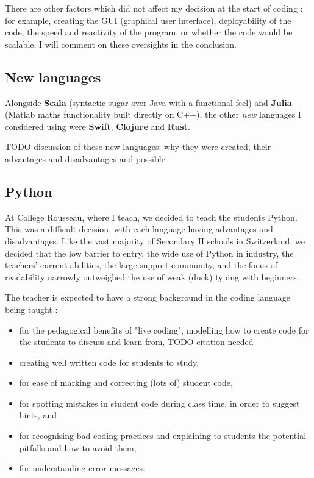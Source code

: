 \documentclass[10pt]{article}
\begin{document}
There are other factors which did not affect my decision at the start of coding : for example, creating the GUI (graphical user interface), deployability of the code, the speed and reactivity of the program, or whether the code would be scalable. I will comment on these oversights in the conclusion.



\subsection{New languages}
Alongside \textbf{Scala} (syntactic sugar over Java with a functional feel) and \textbf{Julia} (Matlab maths functionality built directly on C++), the other \emph{new} languages I considered using were \textbf{Swift}, \textbf{Clojure} and \textbf{Rust}.

TODO discussion of these new languages: why they were created, their advantages and disadvantages and possible 

\subsection{Python}
At Collège Rousseau, where I teach, we decided to teach the students Python. This was a difficult decision, with each language having advantages and disadvantages. Like the vast majority of Secondary II schools in Switzerland, we decided that the low barrier to entry, the wide use of Python in industry, the teachers' current abilities, the large support community, and the focus of readability narrowly outweighed the use of weak (duck) typing with beginners.

The teacher is expected to have a strong background in the coding language being taught :
\begin{itemize}
\item for the pedagogical benefits of "live coding", modelling how to create code for the students to discuss and learn from, TODO citation needed
\item creating well written code for students to study,
\item for ease of marking and correcting (lots of) student code,
\item for spotting mistakes in student code during class time, in order to suggest hints, and
\item for recognising bad coding practices and explaining to students the potential pitfalls and how to avoid them,
\item for understanding error messages.
\end{itemize}
\end{document}
